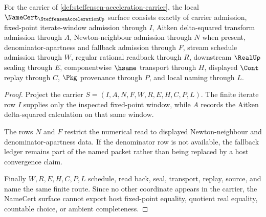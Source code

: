 \begin{theorem}
\label{thm:steffensen-acceleration-namecert-obligations}
For the carrier of \autoref{def:steffensen-acceleration-carrier}, the local $\NameCert_{\SteffensenAccelerationUp}$ surface consists exactly of carrier admission, fixed-point iterate-window admission through $I$, Aitken delta-squared transform admission through $A$, Newton-neighbour admission through $N$ when present, denominator-apartness and fallback admission through $F$, stream schedule admission through $W$, regular rational readback through $R$, downstream $\RealUp$ sealing through $E$, componentwise $\hsame$ transport through $H$, displayed $\Cont$ replay through $C$, $\Pkg$ provenance through $P$, and local naming through $L$.
\end{theorem}
\begin{proof}
Project the carrier $S=(I,A,N,F,W,R,E,H,C,P,L)$. The finite iterate row $I$ supplies only the inspected fixed-point window, while $A$ records the Aitken delta-squared calculation on that same window.

The rows $N$ and $F$ restrict the numerical read to displayed Newton-neighbour and denominator-apartness data. If the denominator row is not available, the fallback ledger remains part of the named packet rather than being replaced by a host convergence claim.

Finally $W,R,E,H,C,P,L$ schedule, read back, seal, transport, replay, source, and name the same finite route. Since no other coordinate appears in the carrier, the NameCert surface cannot export host fixed-point equality, quotient real equality, countable choice, or ambient completeness.
\end{proof}

